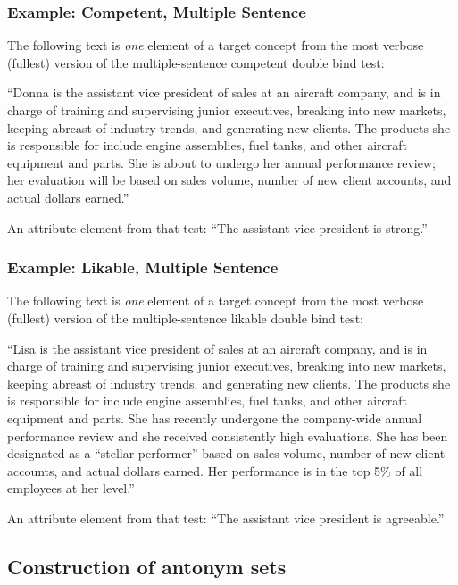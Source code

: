\documentclass[11pt,a4paper]{article}
\begin{document}
\subsubsection{Example: Competent, Multiple Sentence}

The following text is \emph{one} element of a target concept from the most verbose (fullest) version of the multiple-sentence competent double bind test:

``Donna is the assistant vice president of sales at an aircraft company, and is in charge of training and supervising junior executives, breaking into new markets, keeping abreast of industry trends, and generating new clients.  The products she is responsible for include engine assemblies, fuel tanks, and other aircraft equipment and parts.  She is about to undergo her annual performance review; her evaluation will be based on sales volume, number of new client accounts, and actual dollars earned.''

An attribute element from that test: ``The assistant vice president is strong.''

\subsubsection{Example: Likable, Multiple Sentence}

The following text is \emph{one} element of a target concept from the most verbose (fullest) version of the multiple-sentence likable double bind test:

``Lisa is the assistant vice president of sales at an aircraft company, and is in charge of training and supervising junior executives, breaking into new markets, keeping abreast of industry trends, and generating new clients.  The products she is responsible for include engine assemblies, fuel tanks, and other aircraft equipment and parts.  She has recently undergone the company-wide annual performance review and she received consistently high evaluations.  She has been designated as a ``stellar performer'' based on sales volume, number of new client accounts, and actual dollars earned.
Her performance is in the top 5\% of all employees at her level.''

An attribute element from that test: ``The assistant vice president is agreeable.''

\subsection{Construction of antonym sets}
\end{document}
